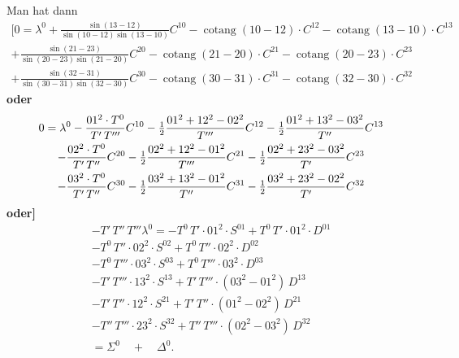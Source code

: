 \documentclass[12pt,a4paper]{article}
\theoremstyle{plain}
\theoremstyle{definition}
\theoremstyle{remark}
\DeclareMathOperator{\cotang}{cotang}
\begin{document}
Man hat dann
\begin{multline*}
[0 = \lambda^0 + \frac{\sin(13 - 12)}{\sin(10 - 12)\sin(13 - 10)} C^{10} - \cotang(10 - 12) \cdot C^{12} - \cotang(13 - 10) \cdot C^{13} \\
+ \frac{\sin(21 - 23)}{\sin(20 - 23)\sin(21 - 20)} C^{20} - \cotang(21 - 20) \cdot C^{21} - \cotang(20 - 23) \cdot C^{23} \\
+ \frac{\sin(32 - 31)}{\sin(30 - 31)\sin(32 - 30)} C^{30} - \cotang(30 - 31) \cdot C^{31} - \cotang(32 - 30) \cdot C^{32}
\end{multline*}
\textbf{oder}
\begin{multline*}
0 = \lambda^0 - \frac{01^2 \cdot T^0}{T'\,T'''\vphantom{^2}} C^{10} - \tfrac{1}{2}\frac{01^2 + 12^2 - 02^2}{T'''\vphantom{^2}} C^{12} - \tfrac{1}{2}\frac{01^2 + 13^2 - 03^2}{T''\vphantom{^2}} C^{13} \\
- \frac{02^2 \cdot T^0}{T'\,T''\vphantom{^2}} C^{20} - \tfrac{1}{2}\frac{02^2 + 12^2 - 01^2}{T'''\vphantom{^2}} C^{21} - \tfrac{1}{2}\frac{02^2 + 23^2 - 03^2}{T'\vphantom{^2}} C^{23} \\
- \frac{03^2 \cdot T^0}{T'\,T''\vphantom{^2}} C^{30} - \tfrac{1}{2}\frac{03^2 + 13^2 - 01^2}{T''\vphantom{^2}} C^{31} - \tfrac{1}{2}\frac{03^2 + 23^2 - 02^2}{T'\vphantom{^2}} C^{32}
\end{multline*}
\textbf{oder]}
\begin{multline*}
-T'\,T''\,T'''\lambda^0 = -T^0\,T' \cdot 01^2 \cdot S^{01} + T^0\,T' \cdot 01^2 \cdot D^{01} \\
- T^0\,T'' \cdot 02^2 \cdot S^{02} + T^0\,T'' \cdot 02^2 \cdot D^{02} \\
- T^0\,T''' \cdot 03^2 \cdot S^{03} + T^0\,T''' \cdot 03^2 \cdot D^{03} \\
- T'\,T''' \cdot 13^2 \cdot S^{13} + T'\,T''' \cdot (03^2 - 01^2)\, D^{13} \\
- T'\,T'' \cdot 12^2 \cdot S^{21} + T'\,T'' \cdot (01^2 - 02^2)\, D^{21} \\
- T''\,T''' \cdot 23^2 \cdot S^{32} + T''\,T''' \cdot (02^2 - 03^2)\, D^{32} \\
= \Sigma^0 \quad + \quad \Delta^0.
\end{multline*}
\end{document}
